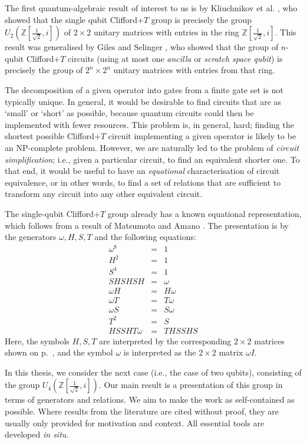 \documentclass{dalthesis}
\theoremstyle{theorem}
\theoremstyle{definition}
\theoremstyle{definition}  %
\theoremstyle{definition}
\newcommand{\Z}{\mathbb{Z}}
\renewcommand{\:}{\mathbin{:}}
\begin{document}
The first quantum-algebraic result of interest to us is by Kliuchnikov et al. {\cite{Kliuchnikov-etal}}, who showed that the single qubit Clifford+$T$ group is precisely the group $U_2(\Z[\frac{1}{\sqrt{2}},i])$ of $2\times 2$ unitary matrices with entries in the ring $\Z[\frac{1}{\sqrt{2}},i]$. This result was generalised by Giles and Selinger {\cite{GILES-SEL}}, who showed that the group of $n$-qubit Clifford+$T$ circuits (using at most one \textit{ancilla} or \textit{scratch space qubit}) is precisely the group of $2^n\times 2^n$ unitary matrices with entries from that ring.

The decomposition of a given operator into gates from a finite gate set is not typically unique. In general, it would be desirable to find circuits that are as `small' or `short' as possible, because quantum circuits could then be implemented with fewer resources. This problem is, in general, hard; finding the shortest possible Clifford+$T$ circuit implementing a given operator is likely to be an NP-complete problem. However, we are naturally led to the problem of \textit{circuit simplification}; i.e., given a particular circuit, to find an equivalent shorter one. To that end, it would be useful to have an \textit{equational} characterisation of circuit equivalence, or in other words, to find a set of relations that are sufficient to transform any circuit into any other equivalent circuit.

The single-qubit Clifford+$T$ group already has a known equational representation, which follows from a result of Matsumoto and Amano {\cite{MATS-AMAN}}. The presentation is by the generators $\omega,H,S,T$ and the following equations: \[\begin{array}{ccc}
\omega^8 &=& 1\\
 H^2 &= &1\\
  S^4 &=& 1\\
  SHSHSH&=&\omega\\
  \omega H&=&H\omega\\
  \omega T&=&T\omega\\
  \omega S&=&S\omega\\
  T^2 &=& S\\
HSSHT\omega &=& THSSHS
\end{array}
\]
Here, the symbols $H,S,T$ are interpreted by the corresponding $2\times 2$ matrices shown on p.~\pageref{page-intro}, and the symbol $\omega$ is interpreted as the $2\times 2$ matrix $\omega I$.

In this thesis, we consider the next case (i.e., the case of two qubits), consisting of the group $U_4(\Z[\frac{1}{\sqrt{2}},i]).$ Our main result is a presentation of this group in terms of generators and relations. We aim to make the work as self-contained as possible. Where results from the literature are cited without proof, they are usually only provided for motivation and context. All essential tools are developed \textit{in situ}.
\end{document}
